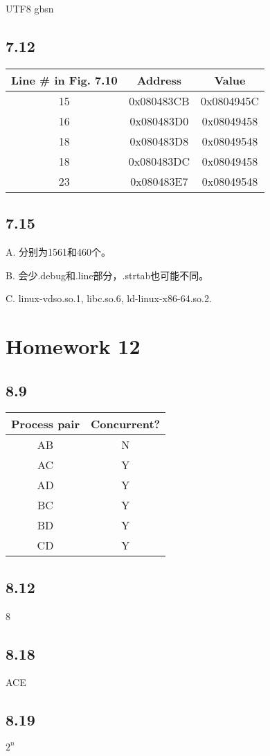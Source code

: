\documentclass {article}
\begin{document}
\begin {CJK*} {UTF8} {gbsn}
			\subsection{7.12}
				\begin{table}[h]
					\begin{tabular}{ccc}
						Line \# in Fig. 7.10 & Address    & Value      \\ \hline
						15                   & 0x080483CB & 0x0804945C \\
						16                   & 0x080483D0 & 0x08049458 \\
						18                   & 0x080483D8 & 0x08049548 \\
						18                   & 0x080483DC & 0x08049458 \\
						23                   & 0x080483E7 & 0x08049548
					\end{tabular}
				\end{table}
				
			\subsection{7.15}
				A. 分别为1561和460个。
				
				B. 会少.debug和.line部分，.strtab也可能不同。
				
				C. linux-vdso.so.1, libc.so.6, ld-linux-x86-64.so.2.

		\section{Homework 12}
			\subsection{8.9}
				\begin{table}[h]
					\begin{tabular}{cc}
						Process pair & Concurrent? \\ \hline
						AB           & N           \\
						AC           & Y           \\
						AD           & Y           \\
						BC           & Y           \\
						BD           & Y           \\
						CD           & Y          
					\end{tabular}
				\end{table}

			\subsection{8.12}
				8

			\subsection{8.18}
				ACE

			\subsection{8.19}
				$2^n$

  \end {CJK*}
\end{document}

